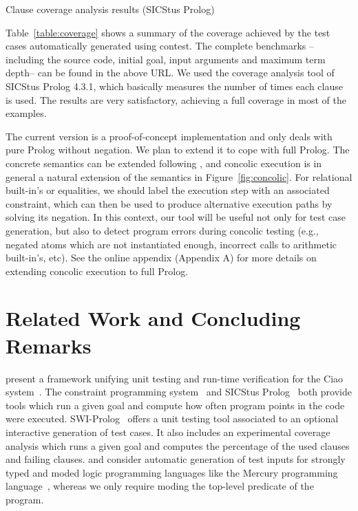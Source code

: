 \documentclass[fleqn]{tlp}
\begin{document}
\begin{table}[t]
  \caption{Clause coverage analysis results (SICStus Prolog)}   \label{table:coverage}
  \centering
  \footnotesize
  
\end{table}

Table~\ref{table:coverage} shows a summary of the coverage achieved by
the test cases automatically generated using \textsf{contest}. The
complete benchmarks --including the source code, initial goal, input
arguments and maximum term depth-- 
can be found in the above URL.
We used the coverage analysis tool of SICStus Prolog 4.3.1, which
basically measures the number of times each clause is used. The
results are very satisfactory, achieving a full coverage in most of
the examples.

The current version is a proof-of-concept implementation and only
deals with pure Prolog without negation. We plan to extend it to cope
with full Prolog. The concrete semantics can be extended following
\cite{SESGF11}, and concolic execution is in general a natural
extension of the semantics in Figure~\ref{fig:concolic}. 
For relational built-in's or
equalities, we should label the execution step with an associated
constraint, which can then be used to produce alternative execution
paths by solving its negation. In this context, our tool will be
useful not only for test case generation, but also to detect program
errors during concolic testing (e.g., negated atoms which are not
instantiated enough, incorrect calls to arithmetic built-in's, etc).
See the online appendix (Appendix A) for more details on extending
concolic execution to full Prolog.

\section{Related Work and Concluding Remarks} \label{relwork}

present a framework unifying unit testing and 
run-time verification for the 
Ciao system~\cite{DBLP:journals/tplp/HermenegildoBCLMMP12}.
The  constraint programming 
system~\cite{DBLP:journals/tplp/SchimpfS12}
and SICStus Prolog~\cite{DBLP:journals/tplp/CarlssonM12}
both provide  tools which run a given goal and compute
how often program points in the code were executed.
SWI-Prolog~\cite{wielemaker:2011:tplp} offers a unit testing tool
associated to an optional interactive generation of test cases.
It also includes an experimental coverage analysis which runs a given goal
and computes the percentage of the used clauses and failing clauses.
 and 
consider automatic generation of test inputs for  strongly typed and moded logic
programming languages like the Mercury programming 
language~\cite{Somogyi96a}, whereas we only require moding the top-level predicate of the program.
\end{document}
